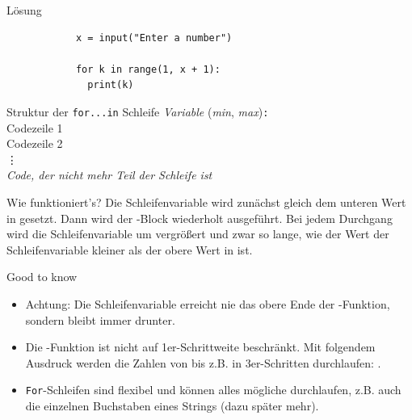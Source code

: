 \begin{fragile}{}
	\begin{block}{Lösung}
		\begin{verbatim}
			x = input("Enter a number")
			
			for k in range(1, x + 1):	
			  print(k)
		\end{verbatim}
	\end{block}
\end{fragile}

\begin{frame}

	\renewcommand{\baselinestretch}{1.5}
	\begin{block}{Struktur der \texttt{for...in} Schleife}
		\vspace{2pt}
		\pause {} \pause \textit{Variable} \pause {} \pause {}(\textit{min}, \textit{max})\pause\texttt{:} \pause \\
		\spacechar\spacechar Codezeile 1 \pause \\ 
\spacechar\spacechar Codezeile 2 \pause \\
\spacechar\spacechar \phantom{Code} \vdots \pause  \\
\textit{Code, der nicht mehr Teil der Schleife ist}
	\end{block}

\vspace{12pt}
\pause 

	\renewcommand{\baselinestretch}{1}
	\begin{block}{Wie funktioniert's?}
		\vspace{2pt}
	Die Schleifenvariable wird zunächst gleich dem unteren Wert in  gesetzt. Dann wird der -Block wiederholt ausgeführt. Bei jedem Durchgang wird die Schleifenvariable um  vergrößert und zwar so lange, wie der Wert der Schleifenvariable kleiner als der obere Wert in  ist. 	
	\end{block}
\end{frame}

\begin{frame}
\begin{block}{Good to know}
	\pause
	\begin{itemize}[<+->]
		\item Achtung: Die Schleifenvariable erreicht nie das obere Ende der -Funktion, sondern bleibt immer  drunter. 
		\item Die -Funktion ist nicht auf 1er-Schrittweite beschränkt. Mit folgendem Ausdruck werden die Zahlen von  bis  z.B. in 3er-Schritten durchlaufen: . 
		\item \texttt{For}-Schleifen sind flexibel und können alles mögliche durchlaufen, z.B. auch die einzelnen Buchstaben eines Strings (dazu später mehr).
	\end{itemize}
\end{block}
\end{frame}

